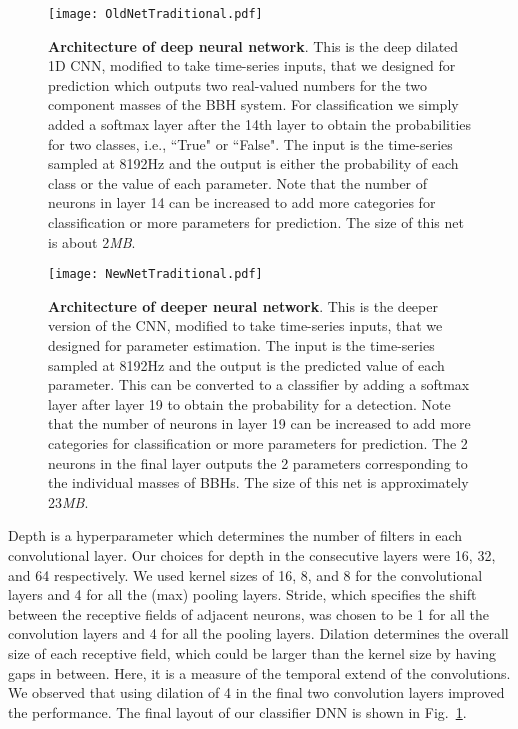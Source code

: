 \documentclass[aps,prd,%
amsmath,floats,floatfix, twocolumn, superscriptaddress,nofootinbib,showpacs]{revtex4-1}
\begin{document}
\begin{figure}
	\centering
	\texttt{[image: OldNetTraditional.pdf]}
	\caption{\textbf{Architecture of deep neural network}. This is the deep dilated 1D CNN, modified to take time-series inputs, that we designed for prediction which outputs two real-valued numbers for the two component masses of the BBH system. For classification we simply added a softmax layer after the 14th layer to obtain the probabilities for two classes, i.e., ``True" or ``False". The input is the time-series sampled at 8192Hz and the output is either the probability of each class or the value of each parameter. Note that the number of neurons in layer 14 can be increased to add more categories for classification or more parameters for prediction. The size of this net is about 2\textit{MB}.}
	\label{fig:Classifier}
\end{figure}

\begin{figure}
	\centering
	\texttt{[image: NewNetTraditional.pdf]}
	\caption{\textbf{Architecture of deeper neural network}. This is the deeper version of the CNN, modified to take time-series inputs, that we designed for parameter estimation. The input is the time-series sampled at 8192Hz and the output is the predicted value of each parameter. This can be converted to a classifier by adding a softmax layer after layer 19 to obtain the probability for a detection. Note that the number of neurons in layer 19 can be increased to add more categories for classification or more parameters for prediction. The 2 neurons in the final layer outputs the 2 parameters corresponding to the individual masses of BBHs. The size of this net is approximately 23\textit{MB}.}
	\label{fig:Predictor}
\end{figure}

\noindent Depth is a hyperparameter which determines the number of filters in each convolutional layer. Our choices for depth in the consecutive layers were 16, 32, and 64 respectively. We used kernel sizes of 16, 8, and 8 for the convolutional layers and 4 for all the (max) pooling layers. Stride, which specifies the shift between the receptive fields of adjacent neurons, was chosen to be 1 for all the convolution layers and 4 for all the pooling layers. Dilation determines the overall size of each receptive field, which could be larger than the kernel size by having gaps in between. Here, it is a measure of the temporal extend of the convolutions. We observed that using dilation of 4 in the final two convolution layers improved the performance. The final layout of our classifier DNN is shown in Fig.~\ref{fig:Classifier}. 
\end{document}
